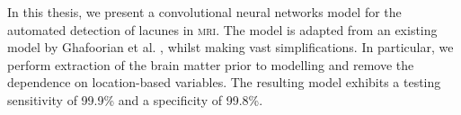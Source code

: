 In this thesis, we present a convolutional neural networks model for the automated detection of lacunes in \textsc{mri}. The model is adapted from an existing model by Ghafoorian et al. \cite{GhafoorianM.2017Dml3}, whilst making vast simplifications. In particular, we perform extraction of the brain matter prior to modelling and remove the dependence on location-based variables. The resulting model exhibits a testing sensitivity of 99.9\% and a specificity of 99.8\%.

